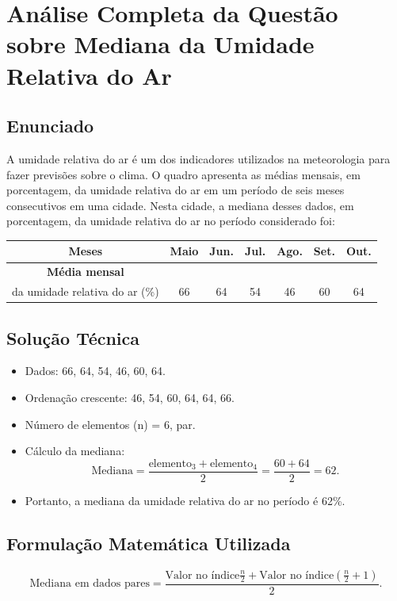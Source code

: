 \documentclass{article}
\begin{document}
\section*{Análise Completa da Questão sobre Mediana da Umidade Relativa do Ar}

\subsection*{Enunciado}
A umidade relativa do ar é um dos indicadores utilizados na meteorologia para fazer previsões sobre o clima. O quadro apresenta as médias mensais, em porcentagem, da umidade relativa do ar em um período de seis meses consecutivos em uma cidade. Nesta cidade, a mediana desses dados, em porcentagem, da umidade relativa do ar no período considerado foi:

\begin{center}
\begin{tabular}{|c|c|c|c|c|c|c|}
\hline
\cellcolor{blue!20}\textbf{Meses} & Maio & Jun. & Jul. & Ago. & Set. & Out. \\
\hline
\cellcolor{blue!20}\textbf{Média mensal} \\ \cellcolor{blue!20} da umidade relativa do ar (\%)} & 66 & 64 & 54 & 46 & 60 & 64 \\
\hline
\end{tabular}
\end{center}

\subsection*{Solução Técnica}
\begin{itemize}
\item Dados: 66, 64, 54, 46, 60, 64.
\item Ordenação crescente: 46, 54, 60, 64, 64, 66.
\item Número de elementos (n) = 6, par.
\item Cálculo da mediana:
\[
\text{Mediana} = \frac{\text{elemento}_3 + \text{elemento}_4}{2} = \frac{60 + 64}{2} = 62.
\]
\item Portanto, a mediana da umidade relativa do ar no período é 62\%.
\end{itemize}

\subsection*{Formulação Matemática Utilizada}
\begin{equation*}
\text{Mediana em dados pares} = \frac{ \text{Valor no índice} \frac{n}{2} + \text{Valor no índice} \left(\frac{n}{2} + 1\right)}{2}.
\end{equation*}
\end{document}
